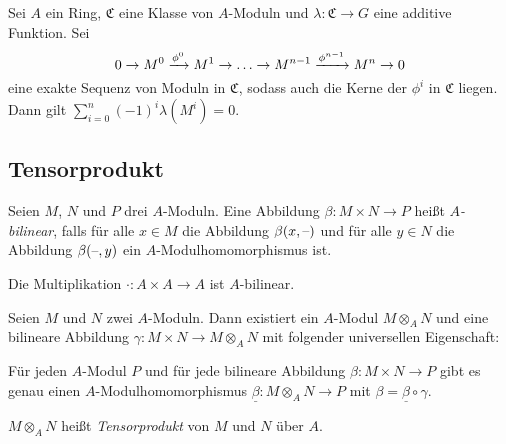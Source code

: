 \documentclass{cheat-sheet}
\newcommand{\SC}{\mathfrak{C}} %
\begin{document}
\begin{prop}
  Sei $A$ ein Ring, $\SC$ eine Klasse von $A$-Moduln und $\lambda : \SC \to G$ eine additive Funktion.
  Sei
  \[
    0 \to M^0 \xrightarrow{\phi^0} M^1 \to \ldots \to M^{n-1} \xrightarrow{\phi^{n-1}} M^n \to 0
  \]
  eine exakte Sequenz von Moduln in $\SC$, sodass auch die Kerne der $\phi^i$ in $\SC$ liegen.
  Dann gilt
  $\sum_{i=0}^n (-1)^i \lambda(M^i) = 0$.
\end{prop}

\subsection{Tensorprodukt}


\begin{defn}
  Seien $M$, $N$ und $P$ drei $A$-Moduln.
  Eine Abbildung $\beta : M \times N \to P$ heißt \emph{$A$-bilinear}, falls für alle $x \in M$ die Abbildung $\beta(x, \text{--})$ und für alle $y \in N$ die Abbildung $\beta(\text{--}, y)$ ein $A$-Modulhomomorphismus ist.
\end{defn}

\begin{bsp}
  Die Multiplikation $\cdot : A \times A \to A$ ist $A$-bilinear.
\end{bsp}

\begin{prop}
  Seien $M$ und $N$ zwei $A$-Moduln.
  Dann existiert ein $A$-Modul $M \otimes_A N$ und eine bilineare Abbildung $\gamma : M \times N \to M \otimes_A N$ mit folgender universellen Eigenschaft:

  \hfill\begin{minipage}{0.95 \linewidth}
    Für jeden $A$-Modul $P$ und für jede bilineare Abbildung $\beta : M \times N \to P$ gibt es genau einen $A$-Modulhomomorphismus $\underline{\beta} : M \otimes_A N \to P$ mit $\beta = \underline{\beta} \circ \gamma$.
  \end{minipage}
\end{prop}

\begin{defn}
  $M \otimes_A N$ heißt \emph{Tensorprodukt} von $M$ und $N$ über $A$.
\end{defn}
\end{document}
